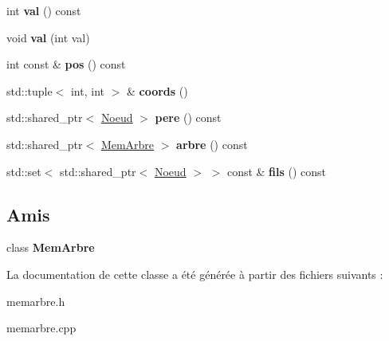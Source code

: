 \begin{DoxyCompactItemize}
\item 
int {\bfseries val} () const \hypertarget{classMemArbre_1_1Noeud_a6a4ea4e942bf9386355fbc07b9b20a58}{}\label{classMemArbre_1_1Noeud_a6a4ea4e942bf9386355fbc07b9b20a58}

\item 
void {\bfseries val} (int val)\hypertarget{classMemArbre_1_1Noeud_a1a0284e4bbece82e6ba90147daf15fbb}{}\label{classMemArbre_1_1Noeud_a1a0284e4bbece82e6ba90147daf15fbb}

\item 
int const \& {\bfseries pos} () const \hypertarget{classMemArbre_1_1Noeud_a80908f07b60962b3ad38a5bcdd3e739f}{}\label{classMemArbre_1_1Noeud_a80908f07b60962b3ad38a5bcdd3e739f}

\item 
std\+::tuple$<$ int, int $>$ \& {\bfseries coords} ()\hypertarget{classMemArbre_1_1Noeud_a97ffd0d907bf6d61fc19446212c676de}{}\label{classMemArbre_1_1Noeud_a97ffd0d907bf6d61fc19446212c676de}

\item 
std\+::shared\+\_\+ptr$<$ \hyperlink{classMemArbre_1_1Noeud}{Noeud} $>$ {\bfseries pere} () const \hypertarget{classMemArbre_1_1Noeud_ade2357880c5929f836edc962301edf25}{}\label{classMemArbre_1_1Noeud_ade2357880c5929f836edc962301edf25}

\item 
std\+::shared\+\_\+ptr$<$ \hyperlink{classMemArbre}{Mem\+Arbre} $>$ {\bfseries arbre} () const \hypertarget{classMemArbre_1_1Noeud_a3e4c43603bc73e9b3c59c4f484d66436}{}\label{classMemArbre_1_1Noeud_a3e4c43603bc73e9b3c59c4f484d66436}

\item 
std\+::set$<$ std\+::shared\+\_\+ptr$<$ \hyperlink{classMemArbre_1_1Noeud}{Noeud} $>$ $>$ const \& {\bfseries fils} () const \hypertarget{classMemArbre_1_1Noeud_a7c627d3c87dac568a9d39d8f65516626}{}\label{classMemArbre_1_1Noeud_a7c627d3c87dac568a9d39d8f65516626}

\end{DoxyCompactItemize}
\subsection*{Amis}
\begin{DoxyCompactItemize}
\item 
class {\bfseries Mem\+Arbre}\hypertarget{classMemArbre_1_1Noeud_a2828cd0bf50a0db376c8e9b9eeda2637}{}\label{classMemArbre_1_1Noeud_a2828cd0bf50a0db376c8e9b9eeda2637}

\end{DoxyCompactItemize}


La documentation de cette classe a été générée à partir des fichiers suivants \+:\begin{DoxyCompactItemize}
\item 
memarbre.\+h\item 
memarbre.\+cpp\end{DoxyCompactItemize}
